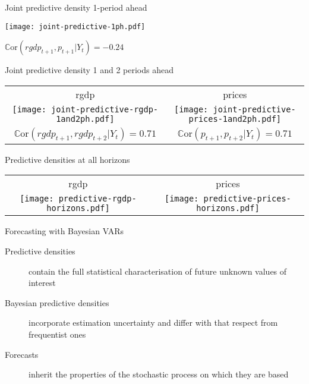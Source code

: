 \documentclass[notes,blackandwhite,mathsans,usenames,dvipsnames]{beamer}
\begin{document}
\begin{frame}{Joint predictive density 1-period ahead}

\centering
\texttt{[image: joint-predictive-1ph.pdf]}

\footnotesize$\mathbb{C}\text{or}(rgdp_{t+1},p_{t+1}|Y_t)=-0.24$

\end{frame}



\begin{frame}{Joint predictive density 1 and 2 periods ahead}

\centering
\begin{tabular}{cc}
rgdp & {\color{mcxs2}prices}\\
\texttt{[image: joint-predictive-rgdp-1and2ph.pdf]} &
\texttt{[image: joint-predictive-prices-1and2ph.pdf]}\\
\footnotesize$\mathbb{C}\text{or}(rgdp_{t+1},rgdp_{t+2}|Y_t)=0.71$ &
\footnotesize$\mathbb{C}\text{or}(p_{t+1},p_{t+2}|Y_t)=0.71$ 
\end{tabular}

\end{frame}



\begin{frame}{Predictive densities at all horizons}

\centering
\begin{tabular}{cc}
rgdp & {\color{mcxs2}prices}\\
\texttt{[image: predictive-rgdp-horizons.pdf]} &
\texttt{[image: predictive-prices-horizons.pdf]}
\end{tabular}

\end{frame}


{
\begin{frame}{\color{mcxs3}Forecasting with Bayesian VARs}

\begin{description}
\item[\color{mcxs3}Predictive densities] {\color{mcxs5}contain the full statistical characterisation of future unknown values of interest}

\bigskip\item[\color{mcxs3}Bayesian predictive densities] {\color{mcxs5}incorporate estimation uncertainty and differ with that respect from frequentist ones}

\bigskip\item[\color{mcxs3}Forecasts] {\color{mcxs5}inherit the properties of the stochastic process on which they are based}
\end{description}

\end{frame}
}
\end{document}
